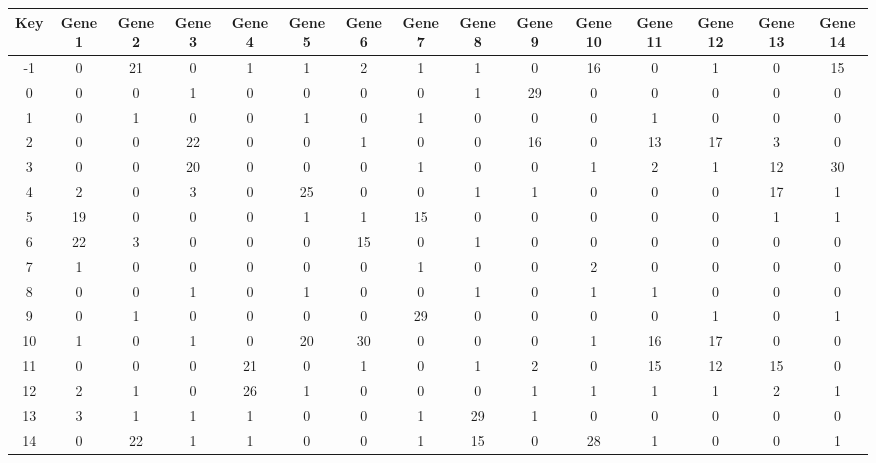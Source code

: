 \begin{tabular}{|c|c|c|c|c|c|c|c|c|c|c|c|c|c|c|}
\hline
Key & Gene 1 & Gene 2 & Gene 3 & Gene 4 & Gene 5 & Gene 6 & Gene 7 & Gene 8 & Gene 9 & Gene 10 & Gene 11 & Gene 12 & Gene 13 & Gene 14 \\
\hline
-1 & 0 & 21 & 0 & 1 & 1 & 2 & 1 & 1 & 0 & 16 & 0 & 1 & 0 & 15 \\
0 & 0 & 0 & 1 & 0 & 0 & 0 & 0 & 1 & 29 & 0 & 0 & 0 & 0 & 0 \\
1 & 0 & 1 & 0 & 0 & 1 & 0 & 1 & 0 & 0 & 0 & 1 & 0 & 0 & 0 \\
2 & 0 & 0 & 22 & 0 & 0 & 1 & 0 & 0 & 16 & 0 & 13 & 17 & 3 & 0 \\
3 & 0 & 0 & 20 & 0 & 0 & 0 & 1 & 0 & 0 & 1 & 2 & 1 & 12 & 30 \\
4 & 2 & 0 & 3 & 0 & 25 & 0 & 0 & 1 & 1 & 0 & 0 & 0 & 17 & 1 \\
5 & 19 & 0 & 0 & 0 & 1 & 1 & 15 & 0 & 0 & 0 & 0 & 0 & 1 & 1 \\
6 & 22 & 3 & 0 & 0 & 0 & 15 & 0 & 1 & 0 & 0 & 0 & 0 & 0 & 0 \\
7 & 1 & 0 & 0 & 0 & 0 & 0 & 1 & 0 & 0 & 2 & 0 & 0 & 0 & 0 \\
8 & 0 & 0 & 1 & 0 & 1 & 0 & 0 & 1 & 0 & 1 & 1 & 0 & 0 & 0 \\
9 & 0 & 1 & 0 & 0 & 0 & 0 & 29 & 0 & 0 & 0 & 0 & 1 & 0 & 1 \\
10 & 1 & 0 & 1 & 0 & 20 & 30 & 0 & 0 & 0 & 1 & 16 & 17 & 0 & 0 \\
11 & 0 & 0 & 0 & 21 & 0 & 1 & 0 & 1 & 2 & 0 & 15 & 12 & 15 & 0 \\
12 & 2 & 1 & 0 & 26 & 1 & 0 & 0 & 0 & 1 & 1 & 1 & 1 & 2 & 1 \\
13 & 3 & 1 & 1 & 1 & 0 & 0 & 1 & 29 & 1 & 0 & 0 & 0 & 0 & 0 \\
14 & 0 & 22 & 1 & 1 & 0 & 0 & 1 & 15 & 0 & 28 & 1 & 0 & 0 & 1 \\
\hline
\end{tabular}